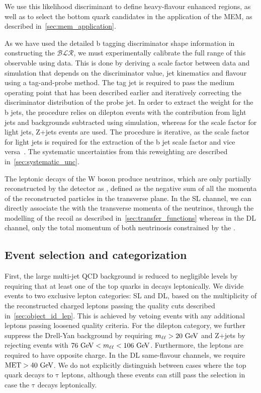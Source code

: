 We use this likelihood discriminant to define heavy-flavour enhanced regions, as well as to select the bottom quark candidates in the application of the MEM, as described in~\cref{sec:mem_application}. 

As we have used the detailed b tagging discriminator shape information in constructing the $\mathcal{BLR}$, we must experimentally calibrate the full range of this observable using data. This is done by deriving a scale factor between data and simulation that depends on the discriminator value, jet kinematics and flavour using a tag-and-probe method. The tag jet is required to pass the medium operating point that has been described earlier and iteratively correcting the discriminator distribution of the probe jet. In order to extract the weight for the b jets, the procedure relies on dilepton \ttbar events with the contribution from light jets and backgrounds subtracted using simulation, whereas for the scale factor for light jets, Z+jets events are used. The procedure is iterative, as the scale factor for light jets is required for the extraction of the b jet scale factor and vice versa~\cite{CMS:2013sea,CMS-PAS-BTV-15-001}. The systematic uncertainties from this reweighting are described in~\cref{sec:systematic_unc}.

The leptonic decays of the W boson produce neutrinos, which are only partially reconstructed by the detector as \MET, defined as the negative sum of all the momenta of the reconstructed particles in the transverse plane. In the SL channel, we can directly associate the \MET with the transverse momenta of the neutrinos, through the modelling of the recoil as described in~\cref{sec:transfer_functions} whereas in the DL channel, only the total momentum of both neutrinosis  constrained by the \MET.

\subsection{Event selection and categorization}
\label{sec:event_selection}

First, the large multi-jet QCD background is reduced to negligible levels by requiring that at least one of the top quarks in \ttHbb decays leptonically. We divide events to two exclusive lepton categories: SL and DL, based on the multiplicity of the reconstructed charged leptons passing the quality cuts described in~\cref{sec:object_id_lep}. This is achieved by vetoing events with any additional leptons passing loosened quality criteria. For the dilepton category, we further suppress the Drell-Yan background by requiring $m_{\ell\ell} > 20~\mathrm{GeV}$ and Z+jets by rejecting events with $76~\mathrm{GeV} < m_{\ell\ell} < 106~\mathrm{GeV}$. Furthermore, the leptons are required to have opposite charge. In the DL same-flavour channels, we require $\mathrm{MET} > 40~\mathrm{GeV}$. We do not explicitly distinguish between cases where the top quark decays to $\mathrm{\tau}$ leptons, although these events can still pass the selection in case the $\mathrm{\tau}$ decays leptonically.

